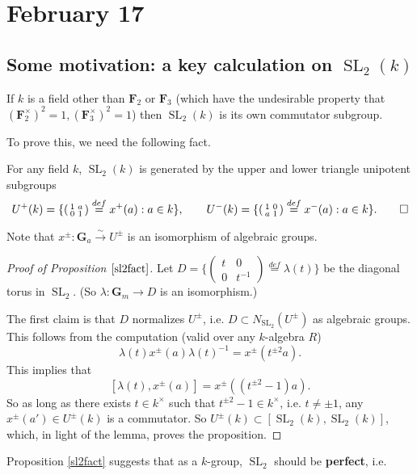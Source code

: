\documentclass[10pt]{article}
\newcommand{\FF}{\mathbf{F}}
\newcommand{\SL}{\operatorname{SL}}
\renewcommand{\(}{\left(}
\renewcommand{\)}{\right)}
\renewcommand{\a}{\mathfrak{a}}
\numberwithin{thm}{subsection}
\begin{document}
\section{February 17}
\subsection{Some motivation: a key calculation on $\SL_2(k)$}
\begin{prop}\label{sl2fact}
If $k$ is a field other than $\FF_2$ or $\FF_3$ (which have
the undesirable property that $(\FF_2^\times)^2=1,(\FF_3^\times)^2=1$)
then $\SL_2(k)$ is its own commutator subgroup.
\end{prop}
To prove this, we need the following fact.
\begin{lem}\cite[Ch.\,XIII, Lemma 8.1]{lang}
For any field $k$, $\SL_2(k)$ is generated by the upper and lower triangle unipotent subgroups
\[U^+(k)=\{\(\begin{smallmatrix}1&a\\0&1\end{smallmatrix}\)\stackrel{def}{=}x^+(a):a\in k\},\qquad U^-(k)=\{\(\begin{smallmatrix}1&0\\a&1\end{smallmatrix}\)\stackrel{def}{=}x^-(a):a\in k\}.\qed\]
\end{lem}
Note that $x^\pm:\mathbf{G}_a\stackrel{\sim}{\to}U^\pm$ is an isomorphism of algebraic groups.
\begin{proof}[Proof of Proposition $\ref{sl2fact}$]
Let $D=\{\(\begin{smallmatrix}t&0\\0&t^{-1}\end{smallmatrix}\)\stackrel{def}{=}\lambda(t)\}$ be the diagonal torus in $\SL_2$.
(So $\lambda:\mathbf{G}_m\to D$ is an isomorphism.)

The first claim is that $D$ normalizes $U^\pm$, i.e. $D\subset N_{\SL_2}(U^\pm)$
as algebraic groups.
This follows from the computation (valid over any $k$-algebra $R$)
\[\lambda(t)x^\pm(a)\lambda(t)^{-1}=x^\pm(t^{\pm2}a).\]
This implies that
\[[\lambda(t),x^\pm(a)]=x^\pm((t^{\pm2}-1)a).\]
So as long as there exists $t\in k^\times$
such that $t^{\pm 2}-1\in k^\times$,
i.e. $t\neq \pm 1$, any $x^\pm(a')\in U^\pm(k)$
is a commutator.
So $U^\pm(k)\subset [\SL_2(k),\SL_2(k)]$,
which, in light of the lemma, proves the proposition.
\end{proof}
Proposition \ref{sl2fact} suggests that as a $k$-group,
$\SL_2$ should be \textbf{perfect}, i.e.
\end{document}
